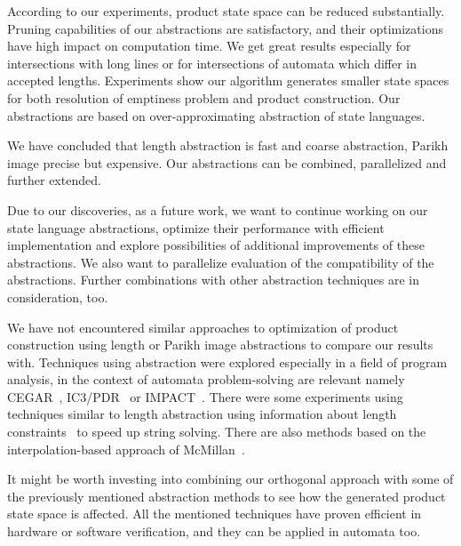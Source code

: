 According to our experiments, product state space can be reduced substantially. Pruning capabilities of our abstractions are satisfactory, and their optimizations have high impact on computation time. We get great results especially for intersections with long lines or for intersections of automata which differ in accepted lengths. Experiments show our algorithm generates smaller state spaces for both resolution of emptiness problem and product construction. Our abstractions are based on over-approximating abstraction of state languages.

We have concluded that length abstraction is fast and coarse abstraction, Parikh image precise but expensive. Our abstractions can be combined, parallelized and further extended.

Due to our discoveries, as a future work, we want to continue working on our state language abstractions, optimize their performance with efficient implementation and explore possibilities of additional improvements of these abstractions. We also want to parallelize evaluation of the compatibility of the abstractions. Further combinations with other abstraction techniques are in consideration, too.

We have not encountered similar approaches to optimization of product construction using length or Parikh image abstractions to compare our results with. Techniques using abstraction were explored especially in a field of program analysis, in the context of automata problem-solving are relevant namely CEGAR~\cite{DBLP:conf/cav/ClarkeGJLV00}, IC3/PDR~\cite{DBLP:conf/sat/HoderB12, DBLP:conf/fmcad/BradleyM07, DBLP:journals/pacmpl/HolikJLRV18, DBLP:conf/cav/WangTLYJ16, DBLP:journals/corr/abs-1708-09073} or IMPACT~\cite{DBLP:conf/cav/McMillan06}. There were some experiments using techniques similar to length abstraction using information about length constraints~\cite{10.1007/978-3-030-81688-9_14} to speed up string solving. There are also methods based on the interpolation-based approach of McMillan~\cite{DBLP:conf/tacas/AmlaM07, DBLP:conf/tacas/GangeNSSS13}.

It might be worth investing into combining our orthogonal approach with some of the previously mentioned abstraction methods to see how the generated product state space is affected. All the mentioned techniques have proven efficient in hardware or software verification, and they can be applied in automata too.

